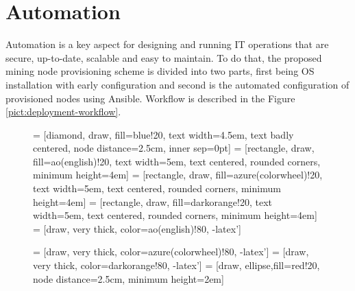\documentclass[
  printed, %
  table,   %
  lof,     %
  lot,     %
           oneside, color
]{fithesis3}
\renewcommand{\texttt}[1]{%
  \begingroup
  \ttfamily
  \begingroup\lccode`~=`/\lowercase{\endgroup\def~}{/\discretionary{}{}{}}%
  \begingroup\lccode`~=`[\lowercase{\endgroup\def~}{[\discretionary{}{}{}}%
  \begingroup\lccode`~=`.\lowercase{\endgroup\def~}{.\discretionary{}{}{}}%
  \catcode`/=\active\catcode`[=\active\catcode`.=\active
  \scantokens{#1\noexpand}%
  \endgroup
}
\begin{document}
\section{Automation}
Automation is a key aspect for designing and running IT operations that are secure, up-to-date, scalable and easy to maintain. To do that, the proposed mining node provisioning scheme is divided into two parts, first being OS installation with early configuration and second is the automated configuration of provisioned nodes using Ansible. Workflow is described in the Figure \ref{pict:deployment-workflow}.
\begin{figure}[H]
\center
{} = [diamond, draw, fill=blue!20,
    text width=4.5em, text badly centered, node distance=2.5cm, inner sep=0pt]
 = [rectangle, draw, fill=ao(english)!20,
    text width=5em, text centered, rounded corners, minimum height=4em]
 = [rectangle, draw, fill=azure(colorwheel)!20,
    text width=5em, text centered, rounded corners, minimum height=4em]
 = [rectangle, draw, fill=darkorange!20,
    text width=5em, text centered, rounded corners, minimum height=4em]
 = [draw, very thick, color=ao(english)!80, -latex']

 = [draw, very thick, color=azure(colorwheel)!80, -latex']
 = [draw, very thick, color=darkorange!80, -latex']
 = [draw, ellipse,fill=red!20, node distance=2.5cm,
    minimum height=2em]

\end{figure}
\end{document}

